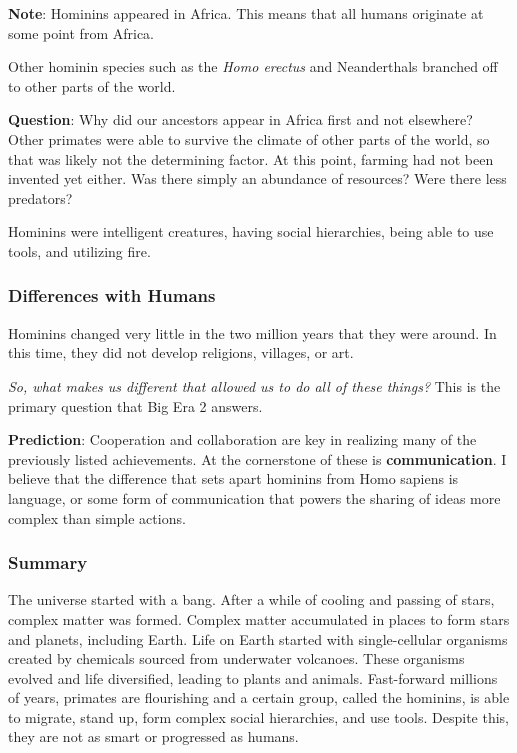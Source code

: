 \documentclass[11pt]{article}
\begin{document}
\textbf{Note}: Hominins appeared in Africa. This means that all humans originate at some point from Africa.

Other hominin species such as the \emph{Homo erectus} and Neanderthals branched off to other parts of the world.

\textbf{Question}: Why did our ancestors appear in Africa first and not elsewhere? Other primates were able to survive the climate of other parts of the world, so that was likely not the determining factor. At this point, farming had not been invented yet either. Was there simply an abundance of resources? Were there less predators?

Hominins were intelligent creatures, having social hierarchies, being able to use tools, and utilizing fire.

\subsubsection{Differences with Humans}
\label{sec:orgc3f5cf2}

Hominins changed very little in the two million years that they were around. In this time, they did not develop religions, villages, or art.

\emph{So, what makes us different that allowed us to do all of these things?} This is the primary question that Big Era 2 answers.

\textbf{Prediction}: Cooperation and collaboration are key in realizing many of the previously listed achievements. At the cornerstone of these is \textbf{communication}. I believe that the difference that sets apart hominins from Homo sapiens is language, or some form of communication that powers the sharing of ideas more complex than simple actions.

\subsubsection{Summary}
\label{sec:orgcb7540d}

The universe started with a bang. After a while of cooling and passing of stars, complex matter was formed. Complex matter accumulated in places to form stars and planets, including Earth. Life on Earth started with single-cellular organisms created by chemicals sourced from underwater volcanoes. These organisms evolved and life diversified, leading to plants and animals. Fast-forward millions of years, primates are flourishing and a certain group, called the hominins, is able to migrate, stand up, form complex social hierarchies, and use tools. Despite this, they are not as smart or progressed as humans.
\end{document}
